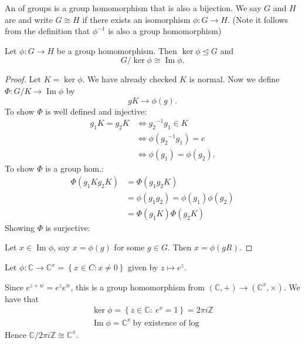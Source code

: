 \documentclass[egregdoesnotlikesansseriftitles,a4paper]{scrartcl}
\begin{document}
\begin{definition*}[Isomorphism]
      An  of groups is a group homomorphism that is also a bijection. We say $G$ and $H$ are  and write $G \cong H$ if there exists an isomorphism $\phi: G \rightarrow H$. (Note it follows from the definition that ${\phi}^{-1}$ is also a group homomorphism)
\end{definition*}

\begin{theorem}
      Let $\phi: G \rightarrow H$ be a group homomorphism. Then $\operatorname{ker}\phi \unlhd G$ and \[
      G/\operatorname{ker}\phi \cong \operatorname{Im} \phi
      .\]
      \begin{proof}
            Let $K=\operatorname{ker} \phi$. We have already checked $K$ is normal. Now we define $\Phi: G/K \rightarrow \operatorname{Im} \phi$ by \[
            gK \rightarrow \phi (g)
            .\]
            To show $\Phi$ is well defined and injective: 
            \begin{align*}
                 g_1 K= g_2 K &\iff {g_2 }^{-1}g_1 \in K\\
                 &\iff \phi ({g_2 }^{-1}g_1 )=e\\
                 &\iff \phi (g_1 )=\phi (g_2 ). 
            \end{align*}
            To show $\Phi$ is a group hom.: 
            \begin{align*}
                 \Phi (g_1 K g_2 K)&=\Phi (g_1 g_2 K)\\
                 &=\phi (g_1 g_2 )=\phi (g_1 ) \phi (g_2 )\\
                 &=\Phi (g_1 K) \Phi (g_2 K)
            \end{align*}
            Showing $\Phi$ is surjective:
      
            Let $x \in \operatorname{Im} \phi$, say $x= \phi (g)$ for some $g \in G$. Then $x=\phi (gR)$.
      \end{proof}
\end{theorem}
\begin{example*}
      Let $\phi: \mathbb{C} \rightarrow \mathbb{C}^x= \left\{x \in C: x \neq 0\right\}$ given by $z \mapsto e^{z}$.

      Since $e^{z+w}=e^{z}e^{w}$, this is a group homomorphism from $(\mathbb{C},+) \rightarrow (\mathbb{C}^{x},\times)$. We have that 
      \begin{align*}
          \operatorname{ker} \phi= \left\{z \in \mathbb{C}: \ e^x=1\right\}=2 \pi i \mathbb{Z}\\
          \operatorname{Im} \phi=\mathbb{C}^{x} \ \text{by existence of log}
      \end{align*}
      Hence $\mathbb{C}/2 \pi i \mathbb{Z} \cong \mathbb{C}^{x}$. 
\end{example*}
\end{document}
